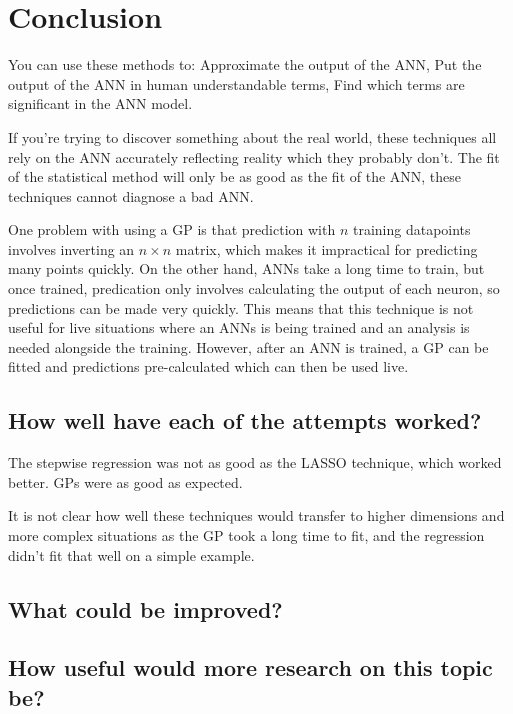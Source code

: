
\chapter{Conclusion}

You can use these methods to:
Approximate the output of the \acl{ANN},
Put the output of the \acl{ANN} in human understandable terms,
Find which terms are significant in the \acl{ANN} model.

If you're trying to discover something about the real world, these techniques all rely on the \acl{ANN} accurately reflecting reality which they probably don't.
The fit of the statistical method will only be as good as the fit of the ANN, these techniques cannot diagnose a bad \acl{ANN}.

One problem with using a \ac{GP} is that prediction with \(n\) training datapoints involves inverting an \(n \times n\) matrix, which makes it impractical for predicting many points quickly.
On the other hand, \aclp{ANN} take a long time to train, but once trained, predication only involves calculating the output of each neuron, so predictions can be made very quickly.
This means that this technique is not useful for live situations where an \aclp{ANN} is being trained and an analysis is needed alongside the training.
However, after an \acl{ANN} is trained, a \ac{GP} can be fitted and predictions pre-calculated which can then be used live.

\section{How well have each of the attempts worked?}

The stepwise regression was not as good as the \ac{LASSO} technique, which worked better.
\acp{GP} were as good as expected.

It is not clear how well these techniques would transfer to higher dimensions and more complex situations as the \ac{GP} took a long time to fit, and the regression didn't fit that well on a simple example.

\section{What could be improved?}

\section{How useful would more research on this topic be?}

